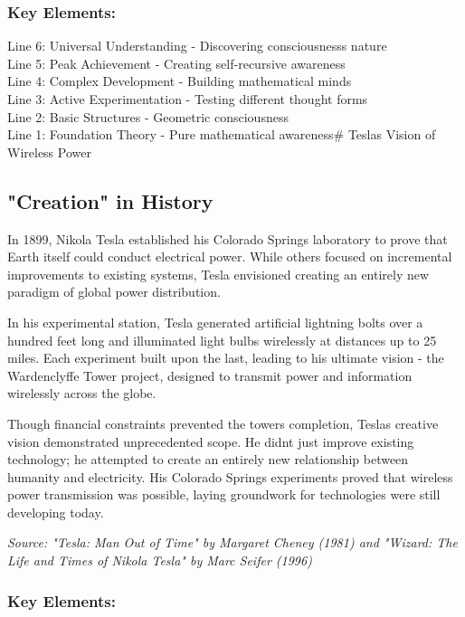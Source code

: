 \documentclass[
]{article}
\begin{document}
\subsubsection{Key Elements:}\label{key-elements-3}

Line 6: Universal Understanding - Discovering
consciousness\textquotesingle s nature\\
Line 5: Peak Achievement - Creating self-recursive awareness\\
Line 4: Complex Development - Building mathematical minds\\
Line 3: Active Experimentation - Testing different thought forms\\
Line 2: Basic Structures - Geometric consciousness\\
Line 1: Foundation Theory - Pure mathematical awareness\#
Tesla\textquotesingle s Vision of Wireless Power

\subsection{"Creation" in History}\label{creation-in-history}

In 1899, Nikola Tesla established his Colorado Springs laboratory to
prove that Earth itself could conduct electrical power. While others
focused on incremental improvements to existing systems, Tesla
envisioned creating an entirely new paradigm of global power
distribution.

In his experimental station, Tesla generated artificial lightning bolts
over a hundred feet long and illuminated light bulbs wirelessly at
distances up to 25 miles. Each experiment built upon the last, leading
to his ultimate vision - the Wardenclyffe Tower project, designed to
transmit power and information wirelessly across the globe.

Though financial constraints prevented the tower\textquotesingle s
completion, Tesla\textquotesingle s creative vision demonstrated
unprecedented scope. He didn\textquotesingle t just improve existing
technology; he attempted to create an entirely new relationship between
humanity and electricity. His Colorado Springs experiments proved that
wireless power transmission was possible, laying groundwork for
technologies we\textquotesingle re still developing today.

\emph{Source: "Tesla: Man Out of Time" by Margaret Cheney (1981) and
"Wizard: The Life and Times of Nikola Tesla" by Marc Seifer (1996)}

\subsubsection{Key Elements:}\label{key-elements-4}
\end{document}
